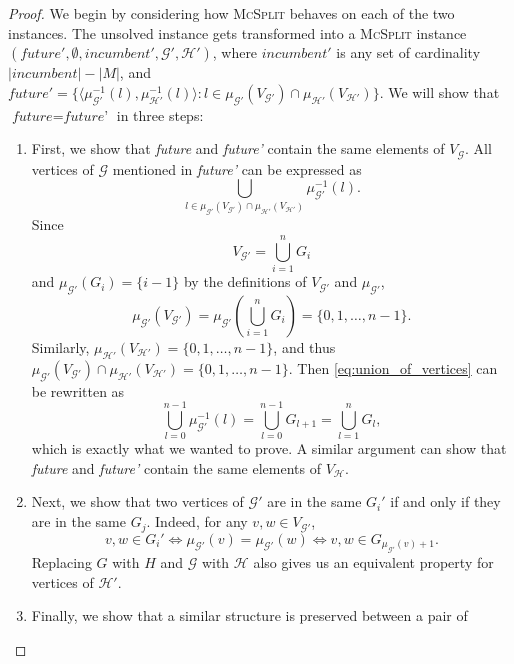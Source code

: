 \documentclass{l4proj}
\theoremstyle{definition}
\theoremstyle{remark}
\begin{document}
\begin{proof}
  We begin by considering how \textsc{McSplit} behaves on each of the two
  instances. The unsolved instance gets transformed into a \textsc{McSplit}
  instance $(\textit{future}', \emptyset, \textit{incumbent}', \mathcal{G'},
  \mathcal{H'})$, where $\textit{incumbent}'$ is any set of cardinality
  $|\textit{incumbent}| - |M|$, and $\textit{future}' = \{ \langle
  \mu_{\mathcal{G'}}^{-1}(l), \mu_{\mathcal{H'}}^{-1}(l) \rangle : l \in
  \mu_{\mathcal{G'}}(V_{\mathcal{G'}}) \cap \mu_{\mathcal{H'}}(V_{\mathcal{H'}})
  \}$. We will show that $\textit{future} = \textit{future'}$ in three steps:
  \begin{enumerate}
  \item First, we show that \textit{future} and \textit{future'} contain the
    same elements of $V_{\mathcal{G}}$. All vertices of $\mathcal{G}$ mentioned
    in \textit{future'} can be expressed as
    \begin{equation} \label{eq:union_of_vertices}
    \bigcup_{l \in \mu_{\mathcal{G'}}(V_{\mathcal{G'}}) \cap
        \mu_{\mathcal{H'}}(V_{\mathcal{H'}})} \mu_{\mathcal{G'}}^{-1}(l).
    \end{equation}
    Since
    \[ V_{\mathcal{G'}} = \bigcup_{i=1}^n G_i \]
    and $\mu_{\mathcal{G'}}(G_i) = \{ i-1 \}$ by the definitions of
    $V_{\mathcal{G'}}$ and $\mu_{\mathcal{G'}}$,
    \[ \mu_{\mathcal{G'}}(V_{\mathcal{G'}}) = \mu_{\mathcal{G'}}\left(
        \bigcup_{i=1}^n G_i \right) = \{ 0, 1, \dots, n - 1 \}. \]
    Similarly, $\mu_{\mathcal{H'}}(V_{\mathcal{H'}}) = \{ 0, 1, \dots, n - 1
    \}$, and thus $\mu_{\mathcal{G'}}(V_{\mathcal{G'}}) \cap
    \mu_{\mathcal{H'}}(V_{\mathcal{H'}}) = \{ 0, 1, \dots, n - 1 \}$. Then
    \eqref{eq:union_of_vertices} can be rewritten as
    \[ \bigcup_{l = 0}^{n-1} \mu_{\mathcal{G'}}^{-1}(l) = \bigcup_{l=0}^{n-1}
      G_{l+1} = \bigcup_{l=1}^n G_l, \]
    which is exactly what we wanted to prove. A similar argument can show that
    \textit{future} and \textit{future'} contain the same elements of
    $V_{\mathcal{H}}$.
  \item Next, we show that two vertices of $\mathcal{G'}$ are in the same $G_i'$
    if and only if they are in the same $G_j$. Indeed, for any $v, w \in
    V_{\mathcal{G'}}$,
    \[ v, w \in G_i' \iff \mu_{\mathcal{G}'}(v) = \mu_{\mathcal{G'}}(w) \iff v,
      w \in G_{\mu_{\mathcal{G'}}(v)+1}. \]
    Replacing $G$ with $H$ and $\mathcal{G}$ with $\mathcal{H}$ also gives us an
    equivalent property for vertices of $\mathcal{H}'$.
  \item Finally, we show that a similar structure is preserved between a pair of

\end{enumerate}
\end{proof}
\end{document}
